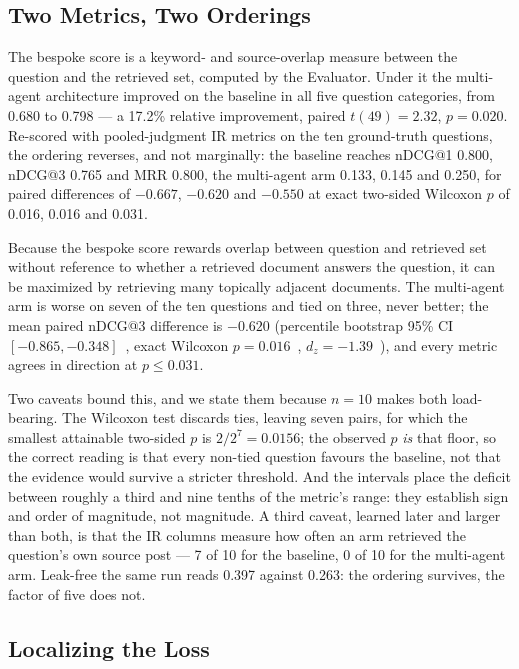 \documentclass[10pt,conference]{IEEEtran}
\begin{document}
\subsection{Two Metrics, Two Orderings}\label{sec:two-metrics}

The bespoke score is a keyword- and source-overlap measure between the question
and the retrieved set, computed by the Evaluator. Under it the multi-agent
architecture improved on the baseline in all five question categories, from
0.680 to 0.798 --- a 17.2\% relative improvement, paired $t(49)=2.32$, $p=0.020$.
Re-scored with pooled-judgment IR metrics on the ten ground-truth questions, the
ordering reverses, and not marginally: the baseline reaches nDCG@1 0.800, nDCG@3
0.765 and MRR 0.800, the multi-agent arm 0.133, 0.145 and 0.250, for paired
differences of $-0.667$, $-0.620$ and $-0.550$ at exact two-sided Wilcoxon $p$ of
0.016, 0.016 and 0.031.

Because the bespoke score rewards overlap between question and retrieved set
without reference to whether a retrieved document answers the question, it can
be maximized by retrieving many topically adjacent documents. The multi-agent
arm is worse on seven of the ten questions and tied on three, never better; the
mean paired nDCG@3 difference is $-0.620$ (percentile bootstrap 95\% CI
$[-0.865,-0.348]$~\cite{efron1993bootstrap}, exact Wilcoxon
$p=0.016$~\cite{wilcoxon1945}, $d_z=-1.39$~\cite{cohen1988power}), and every
metric agrees in direction at $p \le 0.031$.

Two caveats bound this, and we state them because $n=10$ makes both
load-bearing. The Wilcoxon test discards ties, leaving seven pairs, for which the
smallest attainable two-sided $p$ is $2/2^{7}=0.0156$; the observed $p$ \emph{is}
that floor, so the correct reading is that every non-tied question favours the
baseline, not that the evidence would survive a stricter threshold. And the
intervals place the deficit between roughly a third and nine tenths of the
metric's range: they establish sign and order of magnitude, not magnitude. A third
caveat, learned later and larger than both, is that the IR columns measure how
often an arm retrieved the question's own source post --- 7 of 10 for the
baseline, 0 of 10 for the multi-agent arm. Leak-free the same run reads 0.397
against 0.263: the ordering survives, the factor of five does not.

\subsection{Localizing the Loss}\label{sec:localizing}
\end{document}
